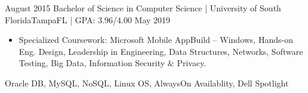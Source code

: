 \begin{experiences}
  \experience
    {August 2015}     {Bachelor of Science in Computer Science | University of South Florida}{Tampa}{FL | GPA: 3.96/4.00}
    {May 2019}    {
                      \begin{itemize}
                       \item Specialized Coursework: Microsoft Mobile AppBuild – Windows, Hands-on Eng. Design, Leadership in Engineering, Data Structures, Networks, Software Testing, Big Data, Information Security \& Privacy.
                      \end{itemize}
                    }
                    {Oracle DB, MySQL, NoSQL, Linux OS, AlwaysOn Availablity, Dell Spotlight}
\end{experiences}